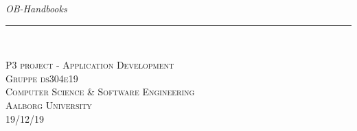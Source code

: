


\thispagestyle{empty}
\begin{flushright}

\vspace{3cm}

\phantom{hul}

\phantom{hul}

\phantom{hul}

\textsl{\Huge  OB-Handbooks} \\ \vspace{1cm}

\rule{13cm}{3mm} \\ \vspace{1.5cm}
\vspace{1cm}

\vspace{2cm} 
\textsc{\Large P3 project - Application Development\\
Gruppe ds304e19 \\
Computer Science \& Software Engineering\\
Aalborg University\\
19/12/19\\}
\end{flushright}
